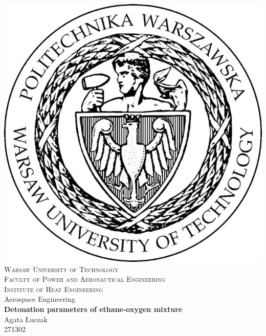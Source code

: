 \newpage
\thispagestyle{empty}


\begin{center}
\centering
\includegraphics[keepaspectratio,scale=2]{WUT_logo.jpeg} \\[1.0cm]
{\fontsize{17}{17}\selectfont
\textsc{Warsaw University of Technology \\[1.5cm]
Faculty of Power and Aeronautical Engineering  \\[.5cm]
Institute of Heat Engineering  \\[1.0cm]}
\huge{Aerospace Engineering \\[1.7cm]}}
\fontsize{30}{30}\selectfont
\textbf{Detonation parameters of ethane-oxygen  mixture \\[3.0cm]}
\huge{Agata Łuczak \\ 271302}
\end{center}

